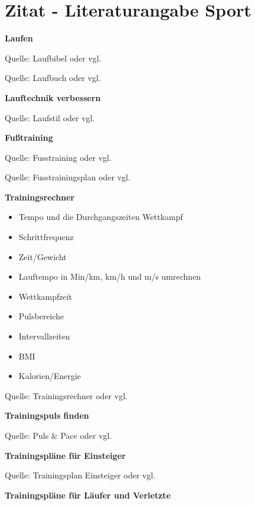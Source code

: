 \section{Zitat - Literaturangabe
Sport}\label{zitat---literaturangabe-sport}

\textbf{Laufen}

Quelle: Laufbibel oder
vgl.~\cite{marquardt_laufbibel:2015}

Quelle: Laufbuch oder
vgl.~\cite{steffny_laufbuch:2006}

\textbf{Lauftechnik verbessern}

Quelle: Laufstil oder
vgl.~\cite{laufstil:2018}

\textbf{Fußtraining}

Quelle: Fusstraining oder
vgl.~\cite{fusstraining:2018}

Quelle: Fusstrainingsplan oder
vgl.~\cite{fusstrainingsplan:2018}

\textbf{Trainingsrechner}

\begin{itemize}
\item
  Tempo und die Durchgangszeiten Wettkampf
\item
  Schrittfrequenz
\item
  Zeit/Gewicht
\item
  Lauftempo in Min/km, km/h und m/s umrechnen
\item
  Wettkampfzeit
\item
  Pulsbereiche
\item
  Intervallzeiten
\item
  BMI
\item
  Kalorien/Energie
\end{itemize}

Quelle: Trainingsrechner oder
vgl.~\cite{trainingsrechner:2018}

\textbf{Trainingspuls finden}

Quelle: Puls \& Pace oder
vgl.~\cite{puls_pace:2018}

\textbf{Trainingspläne für Einsteiger}

Quelle: Trainingsplan
Einsteiger oder
vgl.~\cite{trainingsplan_einsteiger:2018}

\textbf{Trainingspläne für Läufer und Verletzte}

